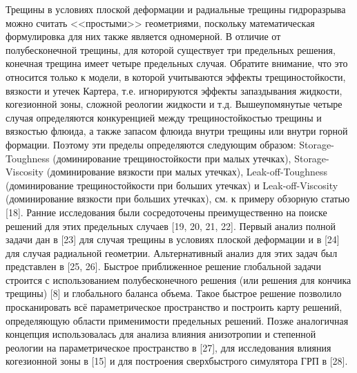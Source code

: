 \documentclass[a4paper, 12pt]{article}
\begin{document}
Трещины в условиях плоской деформации и радиальные трещины гидроразрыва можно считать <<простыми>> геометриями, поскольку математическая формулировка для них также является одномерной.
В отличие от полубесконечной трещины, для которой существует три предельных решения, конечная трещина имеет четыре предельных случая.
Обратите внимание, что это относится только к модели, в которой учитываются эффекты трещиностойкости, вязкости и утечек Картера, т.е. игнорируются эффекты запаздывания жидкости, когезионной зоны, сложной реологии жидкости и т.д.
Вышеупомянутые четыре случая определяются конкуренцией между трещиностойкостью трещины и вязкостью флюида, а также запасом флюида внутри трещины или внутри горной формации.
Поэтому эти пределы определяются следующим образом: Storage-Toughness (доминирование трещиностойкости при малых утечках), Storage-Viscosity (доминирование вязкости при малых утечках), Leak-off-Toughness (доминирование трещиностойкости при больших утечках) и Leak-off-Viscosity (доминирование вязкости при больших утечках), см. к примеру обзорную статью [18].
Ранние исследования были сосредоточены преимущественно на поиске решений для этих предельных случаев [19, 20, 21, 22].
Первый анализ полной задачи дан в [23] для случая трещины в условиях плоской деформации и в [24] для случая радиальной геометрии.
Альтернативный анализ для этих задач был представлен в [25, 26].
Быстрое приближенное решение глобальной задачи строится с использованием полубесконечного решения (или решения для кончика трещины) [8] и глобального баланса объема.
Такое быстрое решение позволило просканировать всё параметрическое пространство и построить карту решений, определяющую области применимости предельных решений.
Позже аналогичная концепция использовалась для анализа влияния анизотропии и степенной реологии на параметрическое пространство в [27], для исследования влияния когезионной зоны в [15] и для построения сверхбыстрого симулятора ГРП в [28].
\end{document}
